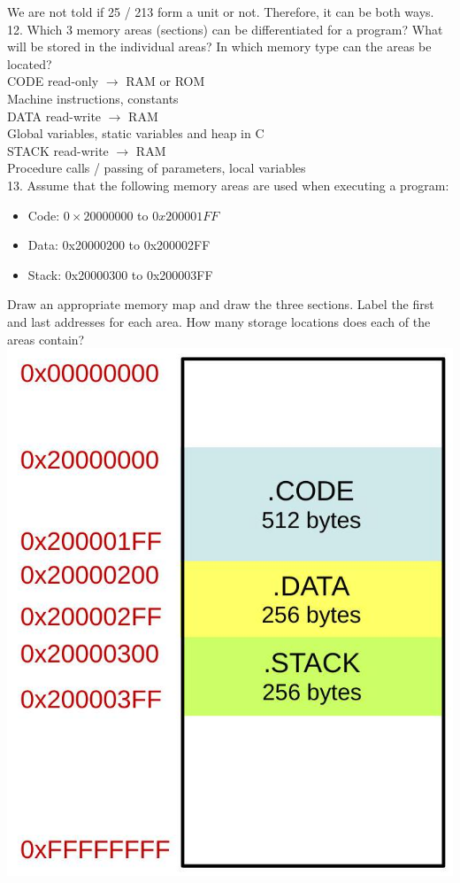 \documentclass[10pt]{article}
\begin{document}
We are not told if 25 / 213 form a unit or not. Therefore, it can be both ways.\\
12. Which 3 memory areas (sections) can be differentiated for a program? What will be stored in the individual areas? In which memory type can the areas be located?\\
CODE read-only $\rightarrow$ RAM or ROM\\
Machine instructions, constants\\
DATA read-write $\rightarrow$ RAM\\
Global variables, static variables and heap in C\\
STACK read-write $\rightarrow$ RAM\\
Procedure calls / passing of parameters, local variables\\
13. Assume that the following memory areas are used when executing a program:

\begin{itemize}
  \item Code: $0 \times 20000000$ to $0 x 200001 F F$
  \item Data: 0x20000200 to 0x200002FF
  \item Stack: 0x20000300 to 0x200003FF
\end{itemize}

Draw an appropriate memory map and draw the three sections. Label the first and last addresses for each area. How many storage locations does each of the areas contain?\\
\includegraphics[width=\linewidth]{images/2025_01_02_5d04f07cd96c1366bf1bg-5}
\end{document}
